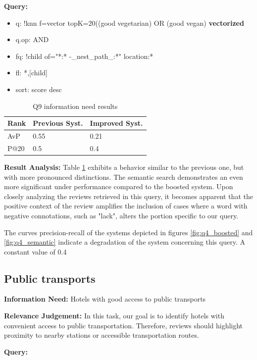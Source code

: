 \documentclass[sigconf]{acmart}
\begin{document}
\textbf{Query:}

\begin{itemize}
    \item q: {!knn f=vector topK=20}((good vegetarian) OR (good vegan) \textbf{vectorized}
    \item q.op: AND
    \item fq: {!child of="*:* -\_nest\_path\_:*"} location:*
    \item fl: *,[child]
    \item sort: score desc
\end{itemize}

\begin{table}[H]
\caption{Q9 information need results}
\label{tab:q9}
\begin{tabular}{lll}
\toprule
Rank & Previous Syst. & Improved Syst.\\
\midrule
AvP & 0.55 & 0.21  \\
P@20 & 0.5 & 0.4 \\
\bottomrule
\end{tabular}
\end{table}

\textbf{Result Analysis:} Table \ref{tab:q9} exhibits a behavior similar to the previous one, but with more pronounced distinctions. The semantic search demonstrates an even more significant under performance compared to the boosted system. 
Upon closely analyzing the reviews retrieved in this query, it becomes apparent that the positive context of the review amplifies the inclusion of cases where a word with negative connotations, such as "lack", alters the portion specific to our query.

The curves precision-recall of the systems depicted in figures \ref{fig:q4_boosted} and \ref{fig:q4_semantic} indicate a degradation of the system concerning this query. A constant value of 0.4

\subsection{Public transports}

\textbf{Information Need:} Hotels with good access to public transports

\textbf{Relevance Judgement:} In this task, our goal is to identify hotels with convenient access to public transportation. Therefore, reviews should highlight proximity to nearby stations or accessible transportation routes.

\textbf{Query:}
\end{document}
